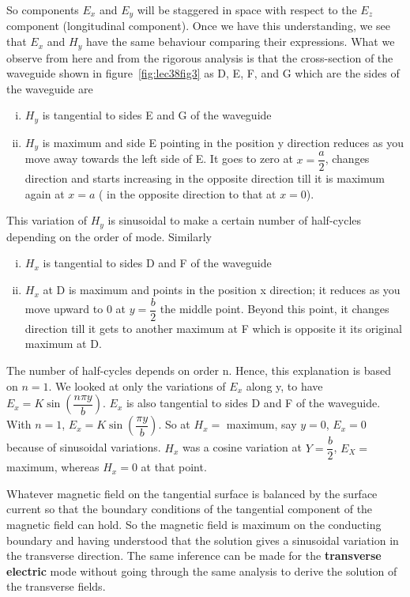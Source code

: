 So components $E_x$ and $E_y$ will be staggered in space with respect to the $E_z$ component (longitudinal component). Once we have this understanding, we see that $E_x$ and $H_y$ have the same behaviour comparing their expressions. What we observe from here and from the rigorous analysis is that the cross-section of the waveguide shown in figure~\ref{fig:lec38fig3} as D, E, F, and G which are the sides of the waveguide are
\begin{enumerate}[(i)]
\item $H_y$ is tangential to sides E and G of the waveguide
\item $H_y$ is maximum and side E pointing in the position y direction reduces as you move away towards the left side of E. It goes to zero at $x=\dfrac{a}{2}$, changes direction and starts increasing in the opposite direction till it is maximum again at $x=a$ ( in the opposite direction to that at $x=0$). 
\end{enumerate}
This variation of $H_y$ is sinusoidal to make a certain number of half-cycles depending on the order of mode. Similarly 
\begin{enumerate}[(i)]
\item $H_x$ is tangential to sides D and F of the waveguide
\item $H_x$ at D is maximum and points in the position x direction; it reduces as you move upward to 0 at $y=\dfrac{b}{2}$ the middle point. Beyond this point, it changes direction till it gets to another maximum at F which is opposite it its original maximum at D. 
\end{enumerate}
The number of half-cycles depends on order n. Hence, this explanation is based on $n=1$. We looked at only the variations of $E_x$ along y, to have $E_x = K\sin\left(\dfrac{n\pi y}{b}\right)$. $E_x$  is also tangential to sides D and F of the waveguide. With $n=1$, $E_x = K\sin\left(\dfrac{\pi y}{b}\right)$. So at $H_x = $ maximum, say $y=0$, $E_x = 0$ because of sinusoidal variations. $H_x$ was a cosine variation at $Y=\dfrac{b}{2}$, $E_X = $ maximum, whereas $H_x = 0$ at that point.

Whatever magnetic field on the tangential surface is balanced by the surface current so that the boundary conditions of the tangential component of the magnetic field can hold. So the magnetic field is maximum on the conducting boundary and having understood that the solution gives a sinusoidal variation in the transverse direction. The same inference can be made for the \textbf{transverse electric} mode without going through the same analysis to derive the solution of the transverse fields.

